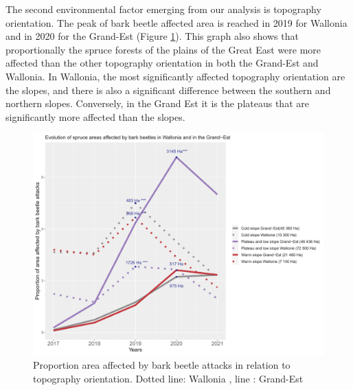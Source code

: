 \documentclass[3p,procedia]{elsarticle}
\begin{document}
The second environmental factor emerging from our analysis is topography orientation. 
The peak of bark beetle affected area is reached in 2019 for Wallonia and in 2020 for the Grand-Est (Figure \ref{ss_sco}).
This graph also shows that proportionally the spruce forests of the plains of the Great East were more affected than the other topography orientation in both the Grand-Est and Wallonia. 
In Wallonia, the most significantly affected topography orientation are the slopes, and there is also a significant difference between the southern and northern slopes. 
Conversely, in the Grand Est it is the plateaus that are significantly more affected than the slopes.
\begin{figure}
\centering
	\includegraphics[width=\textwidth]{evol_ss_GDE_wall.png}
     \caption{Proportion area affected by bark beetle attacks in relation to topography orientation. Dotted line: Wallonia , line : Grand-Est }
	\label{ss_sco}
\end{figure}

	
\end{document}
